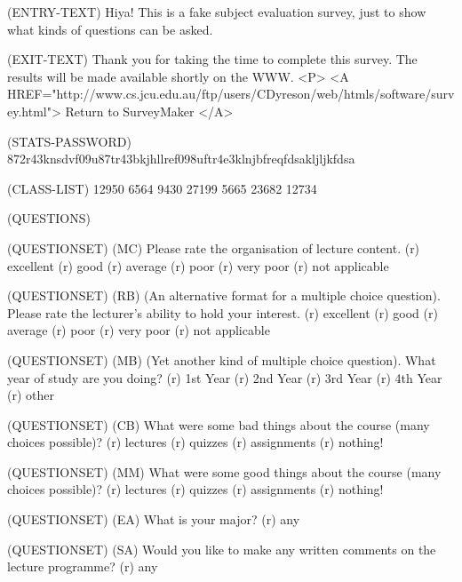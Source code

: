 
(ENTRY-TEXT) 
  Hiya!  This is a fake subject evaluation survey, just to show what kinds
  of questions can be asked.

(EXIT-TEXT) 
  Thank you for taking the time to complete this survey.
  The results will be made available shortly on the WWW.
  <P> 
  <A HREF="http://www.cs.jcu.edu.au/ftp/users/CDyreson/web/htmls/software/survey.html">
  Return to SurveyMaker
  </A>

(STATS-PASSWORD) 
872r43knsdvf09u87tr43bkjhllref098uftr4e3klnjbfreqfdsakljljkfdsa

(CLASS-LIST)
12950
6564
9430
27199
5665
23682
12734

(QUESTIONS)

(QUESTIONSET)
(MC) Please rate the organisation of lecture content.
(r) excellent
(r) good
(r) average
(r) poor
(r) very poor
(r) not applicable

(QUESTIONSET)
(RB) (An alternative format for a multiple choice question).
Please rate the lecturer's ability to hold your interest.
(r) excellent
(r) good
(r) average
(r) poor
(r) very poor
(r) not applicable

(QUESTIONSET)
(MB) (Yet another kind of multiple choice question).
What year of study are you doing?
(r) 1st Year
(r) 2nd Year
(r) 3rd Year
(r) 4th Year
(r) other

(QUESTIONSET)
(CB) What were some bad things about the course (many choices possible)?
(r) lectures
(r) quizzes
(r) assignments
(r) nothing!

(QUESTIONSET)
(MM) What were some good things about the course (many choices possible)?
(r) lectures
(r) quizzes
(r) assignments
(r) nothing!

(QUESTIONSET)
(EA) What is your major?
(r) any

(QUESTIONSET)
(SA) Would you like to make any written comments on the lecture programme?
(r) any
